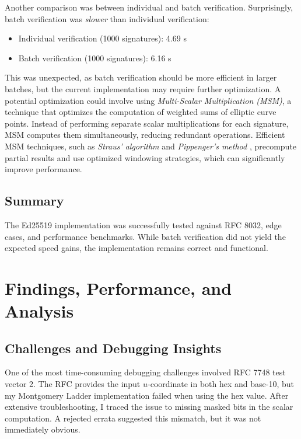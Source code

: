 \documentclass[twoside,a4paper,12pt]{article}
\begin{document}
Another comparison was between individual and batch verification. Surprisingly, batch verification was \textit{slower} than individual verification:
\begin{itemize}
    \item Individual verification (1000 signatures): 4.69 s
    \item {Batch verification (1000 signatures)}: 6.16 s
\end{itemize}
This was unexpected, as batch verification should be more efficient in larger batches, but the current implementation may require further optimization. A potential optimization could involve using \textit{Multi-Scalar Multiplication (MSM)}, a technique that optimizes the computation of weighted sums of elliptic curve points. Instead of performing separate scalar multiplications for each signature, MSM computes them simultaneously, reducing redundant operations. Efficient MSM techniques, such as \textit{Straus' algorithm} \cite{Straus1964} and \textit{Pippenger's method} \cite{pip}, precompute partial results and use optimized windowing strategies, which can significantly improve performance.

\subsection{Summary}
The Ed25519 implementation was successfully tested against RFC 8032, edge cases, and performance benchmarks. While batch verification did not yield the expected speed gains, the implementation remains correct and functional.

\section{Findings, Performance, and Analysis}
\label{sec:analysis}

\subsection{Challenges and Debugging Insights}
\label{subsec:insights_debug}
One of the most time-consuming debugging challenges involved RFC 7748 test vector 2. The RFC provides the input \( u \)-coordinate in both hex and base-10, but my Montgomery Ladder implementation failed when using the hex value. After extensive troubleshooting, I traced the issue to missing masked bits in the scalar computation. A rejected errata suggested this mismatch, but it was not immediately obvious. \\
\end{document}
